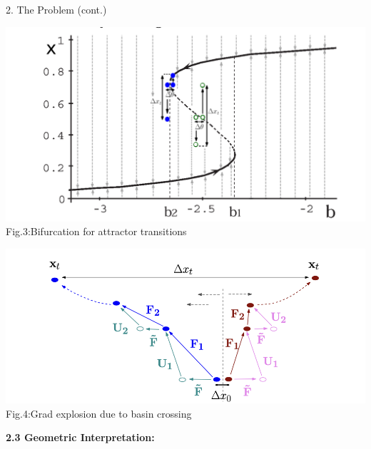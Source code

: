\documentclass[final]{beamer}
\begin{document}
\begin{frame}[t]
\begin{columns}[t,totalwidth=\textwidth]
\begin{column}{0.3\textwidth}
\begin{block}{2. The Problem (cont.)}
{}

    \begin{center}
\begin{minipage}[t]{0.45\linewidth}
    \centering
    \includegraphics[width=\linewidth]{figures/bifurcation.png} \\
    \small Fig.3:Bifurcation for attractor transitions
\end{minipage}
\hfill
\begin{minipage}[t]{0.45\linewidth}
    \centering
    \includegraphics[width=\linewidth]{figures/function_and_input.png} \\
    \small Fig.4:Grad explosion due to basin crossing
\end{minipage}
\end{center}


    \vspace{0.5em}
        \textbf{2.3 Geometric Interpretation:}



\end{block}
\end{column}
\end{columns}
\end{frame}
\end{document}
